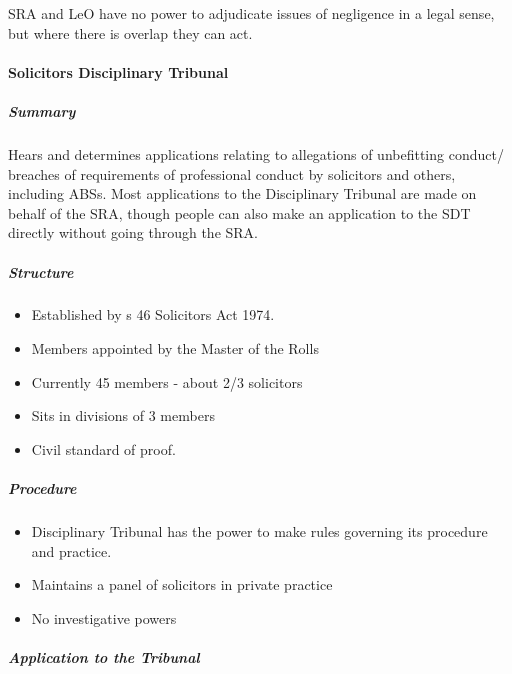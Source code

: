 \documentclass[
]{article}
\providecommand{\tightlist}{%
  \setlength{\itemsep}{0pt}\setlength{\parskip}{0pt}}
\begin{document}
SRA and LeO have no power to adjudicate issues of negligence in a legal
sense, but where there is overlap they can act.

\hypertarget{solicitors-disciplinary-tribunal}{%
\paragraph{Solicitors Disciplinary
Tribunal}\label{solicitors-disciplinary-tribunal}}

\hypertarget{summary}{%
\subparagraph{Summary}\label{summary}}

Hears and determines applications relating to allegations of unbefitting
conduct/ breaches of requirements of professional conduct by solicitors
and others, including ABSs. Most applications to the Disciplinary
Tribunal are made on behalf of the SRA, though people can also make an
application to the SDT directly without going through the SRA.

\hypertarget{structure}{%
\subparagraph{Structure}\label{structure}}

\begin{itemize}
\tightlist
\item
  Established by s 46 Solicitors Act 1974.
\item
  Members appointed by the Master of the Rolls
\item
  Currently 45 members - about 2/3 solicitors
\item
  Sits in divisions of 3 members
\item
  Civil standard of proof.
\end{itemize}

\hypertarget{procedure}{%
\subparagraph{Procedure}\label{procedure}}

\begin{itemize}
\tightlist
\item
  Disciplinary Tribunal has the power to make rules governing its
  procedure and practice.
\item
  Maintains a panel of solicitors in private practice
\item
  No investigative powers
\end{itemize}

\hypertarget{application-to-the-tribunal}{%
\subparagraph{Application to the
Tribunal}\label{application-to-the-tribunal}}
\end{document}
